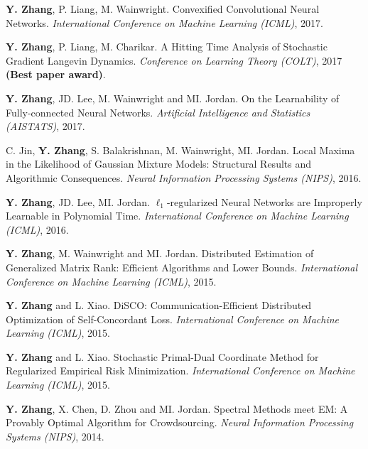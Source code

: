 \documentclass{res} %
\begin{document}
\begin{resume}
\begin{enumerate}[label={[C\arabic*]}, ref={C\arabic*}]
\item  \textbf{Y. Zhang}, P. Liang, M. Wainwright. Convexified Convolutional Neural Networks.
\emph{International Conference on Machine Learning (ICML)}, 2017. \label{convexified-icml17}

\item  \textbf{Y. Zhang}, P. Liang, M. Charikar. A Hitting Time Analysis of Stochastic Gradient Langevin Dynamics.
\emph{Conference on Learning Theory (COLT)}, 2017 {\bf (Best paper award)}. \label{a-hitting-colt17}

\item \textbf{Y. Zhang}, JD. Lee, M. Wainwright and MI. Jordan. On the Learnability of Fully-connected Neural Networks.
\emph{Artificial Intelligence and Statistics (AISTATS)}, 2017. \label{on-the-learnability-aistats17}

\item C. Jin, {\bf Y. Zhang}, S. Balakrishnan, M. Wainwright, MI. Jordan.  
Local Maxima in the Likelihood of Gaussian Mixture Models: Structural Results and Algorithmic Consequences.
\emph{Neural Information Processing Systems (NIPS)}, 2016. \label{local-nips16}

\item \textbf{Y. Zhang}, JD. Lee, MI. Jordan. $\ell_1$-regularized Neural Networks are Improperly Learnable in Polynomial Time.
\emph{International Conference on Machine Learning (ICML)}, 2016. \label{l1-icml16}

\item \textbf{Y. Zhang}, M. Wainwright and MI. Jordan. Distributed Estimation of Generalized Matrix Rank: Efficient Algorithms and Lower Bounds.
\emph{International Conference on Machine Learning (ICML)}, 2015. \label{distributed-icml15}

\item \textbf{Y. Zhang} and L. Xiao. DiSCO: Communication-Efficient Distributed Optimization of Self-Concordant Loss.
\emph{International Conference on Machine Learning (ICML)}, 2015. \label{communication-icml15}

\item \textbf{Y. Zhang} and L. Xiao. Stochastic Primal-Dual Coordinate Method for Regularized Empirical Risk Minimization.
\emph{International Conference on Machine Learning (ICML)}, 2015.\label{stochastic-icml15}

\item \textbf{Y. Zhang}, X. Chen, D. Zhou and MI. Jordan. Spectral Methods meet EM: A Provably Optimal Algorithm for Crowdsourcing.
\emph{Neural Information Processing Systems (NIPS)}, 2014.\label{spectral-nips14}


\end{enumerate}
\end{resume}
\end{document}
